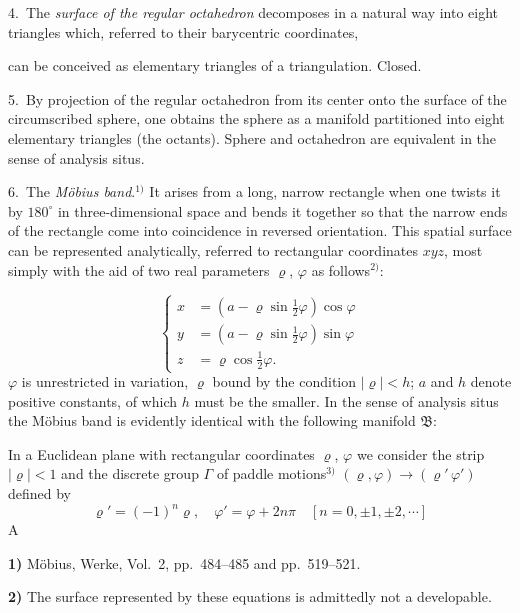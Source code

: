\documentclass{article}
\begin{document}
4.\ The \emph{surface of the regular octahedron} decomposes in a natural way into eight triangles which, referred to their barycentric coordinates,

can be conceived as elementary triangles of a triangulation. Closed.

5.\ By projection of the regular octahedron from its center onto the surface of the circumscribed sphere, one obtains the sphere as a manifold partitioned into eight elementary triangles (the octants). Sphere and octahedron are equivalent in the sense of analysis situs.


6.\ The \emph{Möbius band}.${}^{1)}$ It arises from a long, narrow rectangle when one twists it by $180^\circ$ in three-dimensional space and bends it together so that the narrow ends of the rectangle come into coincidence in reversed orientation. This spatial surface can be represented analytically, referred to rectangular coordinates $xyz$, most simply with the aid of two real parameters $\varrho$, $\varphi$ as follows${}^{2)}$:

\[
\left\{
\begin{aligned}
x &= (a - \varrho \sin \tfrac{1}{2}\varphi) \cos \varphi \\
y &= (a - \varrho \sin \tfrac{1}{2}\varphi) \sin \varphi \\
z &= \varrho \cos \tfrac{1}{2}\varphi.
\end{aligned}
\right.
\]
$\varphi$ is unrestricted in variation, $\varrho$ bound by the condition $|\varrho| < h$; $a$ and $h$ denote positive constants, of which $h$ must be the smaller. In the sense of analysis situs the Möbius band is evidently identical with the following manifold $\mathfrak{B}$:

In a Euclidean plane with rectangular coordinates $\varrho$, $\varphi$ we consider the strip $|\varrho| < 1$ and the discrete group $\varGamma$ of paddle motions${}^{3)}$ $(\varrho, \varphi) \to (\varrho'\,\varphi')$ defined by
\[
\varrho' = (-1)^n \varrho, \quad \varphi' = \varphi + 2n\pi \quad [n = 0, \pm 1, \pm 2, \cdots]
\]
A

\textbf{1)} Möbius, Werke, Vol.~2, pp.~484--485 and pp.~519--521.

\textbf{2)} The surface represented by these equations is admittedly not a developable.
\end{document}
